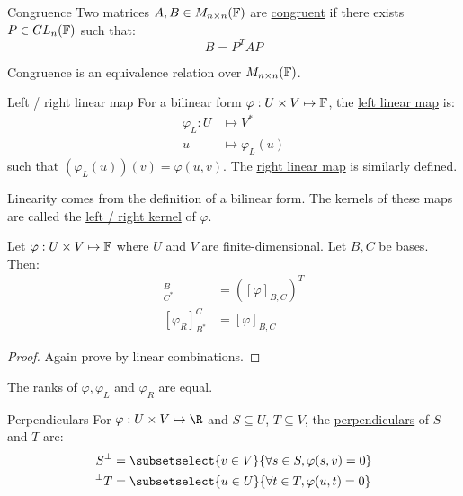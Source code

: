 \documentclass[../Main.tex]{subfiles}
\begin{document}
\begin{definition}{Congruence}
    Two matrices $A, B \in M_{n \times n}(\mathbb{F})$ are \underline{congruent} if there exists $P \in GL_n(\mathbb{F})$ such that:
    \begin{equation*}
        B = P^TAP
    \end{equation*}
\end{definition}
\begin{proposition}
    Congruence is an equivalence relation over $M_{n \times n}(\mathbb{F})$.
    \label{propCongruenceEquiv}
\end{proposition}
\begin{definition}{Left / right linear map}
    For a bilinear form $\varphi : U \times V \mapsto \mathbb{F}$, the \underline{left linear map} is:
    \begin{align*}
        \varphi_L : U &\mapsto V^*\\
        u &\mapsto \varphi_L(u)
    \end{align*}
    such that $(\varphi_L(u))(v) = \varphi(u, v)$. The \underline{right linear map} is similarly defined.
\end{definition}
Linearity comes from the definition of a bilinear form. The kernels of these maps are called the \underline{left / right kernel} of $\varphi$.
\begin{proposition}
    Let $\varphi : U \times V \mapsto \mathbb{F}$ where $U$ and $V$ are finite-dimensional. Let $B, C$ be bases. Then:
    \begin{align*}
        [\varphi_L]^B_{C^*} &= \left([\varphi]_{B, C}\right)^T \\
        [\varphi_R]^C_{B^*} &= [\varphi]_{B, C}
    \end{align*}
    \label{propLRLinMapMatrices}
\end{proposition}
\begin{proof}
    Again prove by linear combinations.
\end{proof}
\begin{corollary}
    The ranks of $\varphi, \varphi_L$ and $\varphi_R$ are equal.
    \label{corRankBF}
\end{corollary}
\begin{definition}{Perpendiculars}
    For $\varphi : U \times V \mapsto \R$ and $S \subseteq U$, $T \subseteq V$, the \underline{perpendiculars} of $S$ and $T$ are:
    \begin{align*}
        S^\perp &= \subsetselect{v \in V}{\forall s \in S, \varphi(s, v) = 0} \\
        \lperp{T} &= \subsetselect{u \in U}{\forall t \in T, \varphi(u, t) = 0} \\
    \end{align*}
\end{definition}
\end{document}
